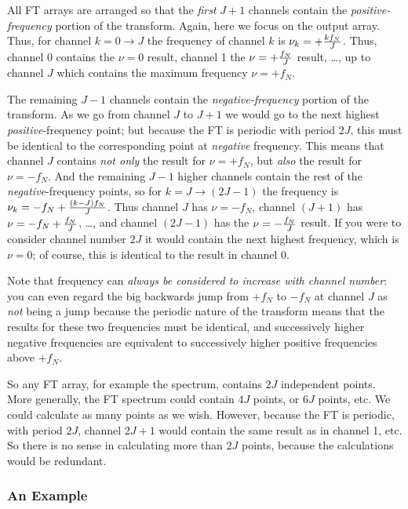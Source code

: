 \documentclass[11pt,preprint]{aastex}
\begin{document}
          All FT arrays are arranged so that the {\it first} $J+1$
channels contain the {\it positive-frequency} portion of the transform. 
Again, here we focus on the output array.  Thus, for channel $k = 0
\rightarrow J$ the frequency of channel $k$ is $\nu _k = +{k f_N \over
J}$.  Thus, channel 0 contains the $\nu =0$ result, channel 1 the $\nu =
+{f_N \over J}$ result, \dots, up to channel $J$ which contains the
maximum frequency $\nu = +f_N$. 

          The remaining $J-1$ channels contain the {\it
negative-frequency} portion of the transform.  As we go from channel $J$
to $J+1$ we would go to the next highest {\it positive}-frequency point;
but because the FT is periodic with period $2J$, this must be identical
to the corresponding point at {\it negative} frequency.  This means that
channel $J$ contains {\it not only} the result for $\nu = +f_N$, but {\it
also} the result for $\nu = -f_N$.  And the remaining $J-1$ higher
channels contain the rest of the {\it negative}-frequency points, so for
$k = J \rightarrow (2J-1)$ the frequency is $\nu _k = -f_N + {(k - J) f_N
\over J}$.  Thus channel $J$ has $\nu = -f_N$, channel $(J+1)$ has $\nu =
-f_N + {f_N \over J}$, \dots, and channel $(2J-1)$ has the $\nu = -{f_N
\over J}$ result.  If you were to consider channel number $2J$ it would
contain the next highest frequency, which is $\nu = 0$; of course, this
is identical to the result in channel 0. 

          Note that frequency can {\it always be considered to increase
with channel number}: you can even regard the big backwards jump from
$+f_N$ to $-f_N$ at channel $J$ as {\it not} being a jump because the
periodic nature of the transform means that the results for these two
frequencies must be identical, and successively higher negative
frequencies are equivalent to successively higher positive frequencies
above $+f_N$. 

          So any FT array, for example the spectrum, contains $2J$
independent points.  More generally, the FT spectrum could contain $4J$
points, or $6J$ points, etc.  We could calculate as many points as we
wish.  However, because the FT is periodic, with period $2J$, channel
$2J+1$ would contain the same result as in channel 1, etc.  So there is
no sense in calculating more than $2J$ points, because the calculations
would be redundant. 

\subsubsection{An Example}
\end{document}
